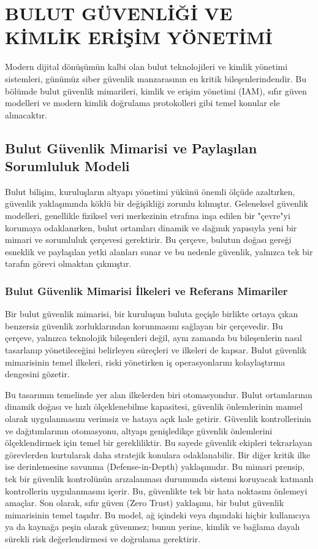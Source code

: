 \chapter{BULUT GÜVENLİĞİ VE KİMLİK ERİŞİM YÖNETİMİ}

Modern dijital dönüşümün kalbi olan bulut teknolojileri ve kimlik yönetimi sistemleri, günümüz siber güvenlik manzarasının en kritik bileşenlerindendir. Bu bölümde bulut güvenlik mimarileri, kimlik ve erişim yönetimi (IAM), sıfır güven modelleri ve modern kimlik doğrulama protokolleri gibi temel konular ele alınacaktır.

\section{Bulut Güvenlik Mimarisi ve Paylaşılan Sorumluluk Modeli}

Bulut bilişim, kuruluşların altyapı yönetimi yükünü önemli ölçüde azaltırken, güvenlik yaklaşımında köklü bir değişikliği zorunlu kılmıştır. Geleneksel güvenlik modelleri, genellikle fiziksel veri merkezinin etrafına inşa edilen bir "çevre"yi korumaya odaklanırken, bulut ortamları dinamik ve dağınık yapısıyla yeni bir mimari ve sorumluluk çerçevesi gerektirir. Bu çerçeve, bulutun doğası gereği esneklik ve paylaşılan yetki alanları sunar ve bu nedenle güvenlik, yalnızca tek bir tarafın görevi olmaktan çıkmıştır.

\subsection{Bulut Güvenlik Mimarisi İlkeleri ve Referans Mimariler}

Bir bulut güvenlik mimarisi, bir kuruluşun buluta geçişle birlikte ortaya çıkan benzersiz güvenlik zorluklarından korunmasını sağlayan bir çerçevedir. Bu çerçeve, yalnızca teknolojik bileşenleri değil, aynı zamanda bu bileşenlerin nasıl tasarlanıp yönetileceğini belirleyen süreçleri ve ilkeleri de kapsar. Bulut güvenlik mimarisinin temel ilkeleri, riski yönetirken iş operasyonlarını kolaylaştırma dengesini gözetir.

Bu tasarımın temelinde yer alan ilkelerden biri otomasyondur. Bulut ortamlarının dinamik doğası ve hızlı ölçeklenebilme kapasitesi, güvenlik önlemlerinin manuel olarak uygulanmasını verimsiz ve hataya açık hale getirir. Güvenlik kontrollerinin ve dağıtımlarının otomasyonu, altyapı genişledikçe güvenlik önlemlerini ölçeklendirmek için temel bir gerekliliktir. Bu sayede güvenlik ekipleri tekrarlayan görevlerden kurtularak daha stratejik konulara odaklanabilir. Bir diğer kritik ilke ise derinlemesine savunma (Defense-in-Depth) yaklaşımıdır. Bu mimari prensip, tek bir güvenlik kontrolünün arızalanması durumunda sistemi koruyacak katmanlı kontrollerin uygulanmasını içerir. Bu, güvenlikte tek bir hata noktasını önlemeyi amaçlar. Son olarak, sıfır güven (Zero Trust) yaklaşımı, bir bulut güvenlik mimarisinin temel taşıdır. Bu model, ağ içindeki veya dışındaki hiçbir kullanıcıya ya da kaynağa peşin olarak güvenmez; bunun yerine, kimlik ve bağlama dayalı sürekli risk değerlendirmesi ve doğrulama gerektirir.

